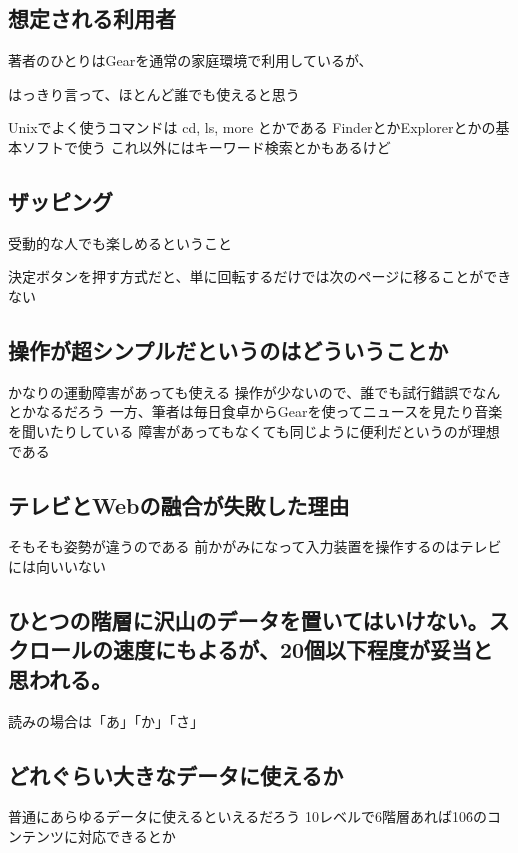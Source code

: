 \documentclass[twoside]{wiss}
\def\GEAR{\textsf{Gear}}
\begin{document}
\subsection*{想定される利用者}

著者のひとりは{\GEAR}を通常の家庭環境で利用しているが、

  はっきり言って、ほとんど誰でも使えると思う

  Unixでよく使うコマンドは cd, ls, more とかである
  FinderとかExplorerとかの基本ソフトで使う
  これ以外にはキーワード検索とかもあるけど

\subsection*{ザッピング}

受動的な人でも楽しめるということ

決定ボタンを押す方式だと、単に回転するだけでは次のページに移ることができない

\subsection*{操作が超シンプルだというのはどういうことか}

  かなりの運動障害があっても使える
  操作が少ないので、誰でも試行錯誤でなんとかなるだろう
  一方、筆者は毎日食卓から{\GEAR}を使ってニュースを見たり音楽を聞いたりしている
  障害があってもなくても同じように便利だというのが理想である

\subsection*{テレビとWebの融合が失敗した理由}
   そもそも姿勢が違うのである
   前かがみになって入力装置を操作するのはテレビには向いいない

\subsection*{ひとつの階層に沢山のデータを置いてはいけない。スクロールの速度にもよるが、20個以下程度が妥当と思われる。}
   読みの場合は「あ」「か」「さ」

\subsection*{どれぐらい大きなデータに使えるか}

   普通にあらゆるデータに使えるといえるだろう
   10レベルで6階層あれば10\^6のコンテンツに対応できるとか
\end{document}
